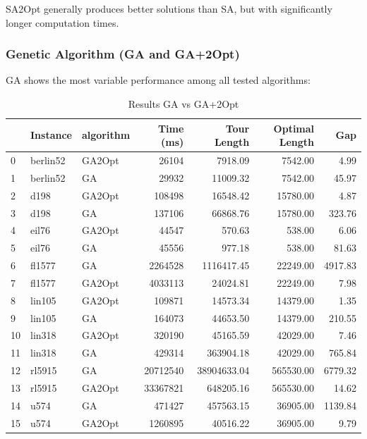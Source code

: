 SA2Opt generally produces better solutions than SA, but with significantly longer computation times.

\subsubsection{Genetic Algorithm (GA and GA+2Opt)}
GA shows the most variable performance among all tested algorithms:

\begin{table}[H]
	\centering

	\caption{Results GA vs GA+2Opt}
	\begin{tabular}{lllrrrr}
		\toprule
		   & Instance & algorithm & Time (ms) & Tour Length & Optimal Length & Gap     \\
		\midrule
		0  & berlin52 & GA2Opt    & 26104      & 7918.09        & 7542.00          & 4.99    \\
		1  & berlin52 & GA        & 29932      & 11009.32       & 7542.00          & 45.97   \\
		2  & d198     & GA2Opt    & 108498     & 16548.42       & 15780.00         & 4.87    \\
		3  & d198     & GA        & 137106     & 66868.76       & 15780.00         & 323.76  \\
		4  & eil76    & GA2Opt    & 44547      & 570.63         & 538.00           & 6.06    \\
		5  & eil76    & GA        & 45556      & 977.18         & 538.00           & 81.63   \\
		6  & fl1577   & GA        & 2264528    & 1116417.45     & 22249.00         & 4917.83 \\
		7  & fl1577   & GA2Opt    & 4033113    & 24024.81       & 22249.00         & 7.98    \\
		8  & lin105   & GA2Opt    & 109871     & 14573.34       & 14379.00         & 1.35    \\
		9  & lin105   & GA        & 164073     & 44653.50       & 14379.00         & 210.55  \\
		10 & lin318   & GA2Opt    & 320190     & 45165.59       & 42029.00         & 7.46    \\
		11 & lin318   & GA        & 429314     & 363904.18      & 42029.00         & 765.84  \\
		12 & rl5915   & GA        & 20712540   & 38904633.04    & 565530.00        & 6779.32 \\
		13 & rl5915   & GA2Opt    & 33367821   & 648205.16      & 565530.00        & 14.62   \\
		14 & u574     & GA        & 471427     & 457563.15      & 36905.00         & 1139.84 \\
		15 & u574     & GA2Opt    & 1260895    & 40516.22       & 36905.00         & 9.79    \\
		\bottomrule
	\end{tabular}
\end{table}

